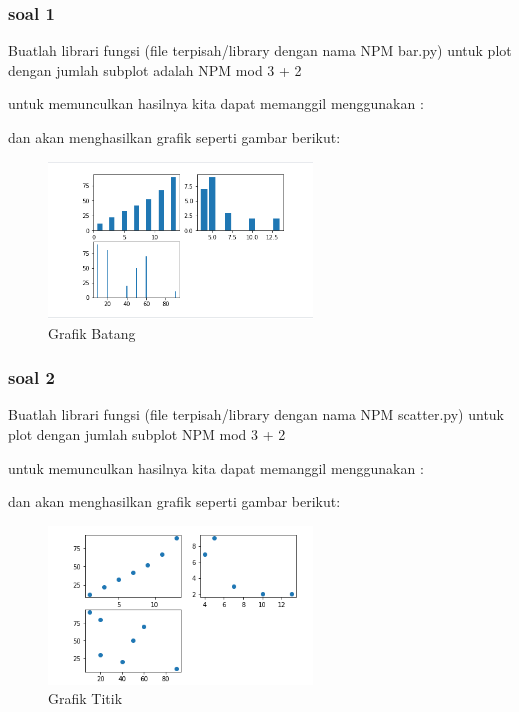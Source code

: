 \subsubsection{soal 1}
 Buatlah librari fungsi (ﬁle terpisah/library dengan nama NPM bar.py) untuk plot dengan jumlah subplot adalah NPM mod 3 + 2

untuk memunculkan hasilnya kita dapat memanggil menggunakan :


dan akan menghasilkan grafik seperti gambar berikut:
\begin{figure}[H]
\centering
\includegraphics[width=7cm]{figures/chapter6/1174063/p1.png}
\caption{Grafik Batang}
\label{Gabe}
\end{figure}

\subsubsection{soal 2}
Buatlah librari fungsi (ﬁle terpisah/library dengan nama NPM scatter.py) untuk plot dengan jumlah subplot NPM mod 3 + 2

untuk memunculkan hasilnya kita dapat memanggil menggunakan :


dan akan menghasilkan grafik seperti gambar berikut:
\begin{figure}[H]
\centering
\includegraphics[width=7cm]{figures/chapter6/1174063/p2.png}
\caption{Grafik Titik}
\label{GAbe}
\end{figure}


